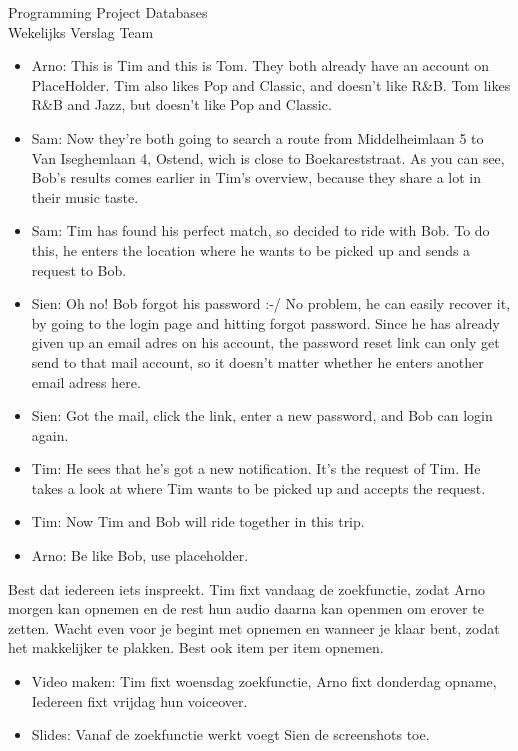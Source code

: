 \documentclass{article}
\newcounter{team}
\begin{document}
\begin{Minutes}{Programming Project Databases \\ Wekelijks Verslag Team }
\begin{itemize}
            \item Arno: This is Tim and this is Tom. They both already have an account on PlaceHolder. Tim also likes Pop and Classic, and doesn't like R&B. Tom likes R&B and Jazz, but doesn't like Pop and Classic.
            \item Sam: Now they're both going to search a route from Middelheimlaan 5 to Van Iseghemlaan 4, Ostend, wich is close to Boekareststraat. As you can see, Bob's results comes earlier in Tim's overview, because they share a lot in their music taste.
            \item Sam: Tim has found his perfect match, so decided to ride with Bob. To do this, he enters the location where he wants to be picked up and sends a request to Bob.
            \item Sien: Oh no! Bob forgot his password :-/ No problem, he can easily recover it, by going to the login page and hitting forgot password. Since he has already given up an email adres on his account, the password reset link can only get send to that mail account, so it doesn't matter whether he enters another email adress here.
            \item Sien: Got the mail, click the link, enter a new password, and Bob can login again.
            \item Tim: He sees that he's got a new notification. It's the request of Tim. He takes a look at where Tim wants to be picked up and accepts the request.
            \item Tim: Now Tim and Bob will ride together in this  trip.
            \item Arno: Be like Bob, use placeholder.
            \end{itemize}
            Best dat iedereen iets inspreekt. Tim fixt vandaag de zoekfunctie, zodat Arno morgen kan opnemen en de rest hun audio daarna kan openmen om erover te zetten. Wacht even voor je begint met opnemen en wanneer je klaar bent, zodat het makkelijker te plakken. Best ook item per item opnemen.


        \begin{itemize}

            \item Video maken: Tim fixt woensdag zoekfunctie, Arno fixt donderdag opname, Iedereen fixt vrijdag hun voiceover.
            \item Slides: Vanaf de zoekfunctie werkt voegt Sien de screenshots toe.


\end{itemize}
\end{Minutes}
\end{document}
